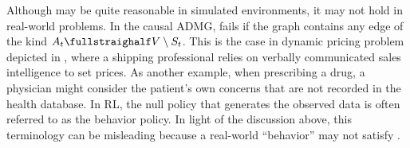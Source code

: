 \documentclass[12pt,a4paper]{article}
\theoremstyle{definition}
\newcommand{\PP}[0]{\mathbb{P}}
\DeclareMathOperator{\gG}{\mathscr{G}}
\begin{document}
Although  may be quite reasonable in
simulated environments, it may not hold in real-world problems. In the
causal ADMG,  fails if the graph contains any
edge of the kind $A_t \fullstraighalf V \setminus S_t$. This is the
case in dynamic pricing problem depicted in
,
where a shipping professional relies on verbally communicated sales
intelligence to set prices. As another example, when
prescribing a drug, a physician might consider the patient's own
concerns that are not recorded in the health database. In RL, the null
policy that generates the observed data is often referred to as the
behavior policy. In light of the discussion above, this
terminology can be misleading because a real-world ``behavior'' may not
satisfy .


\end{document}
